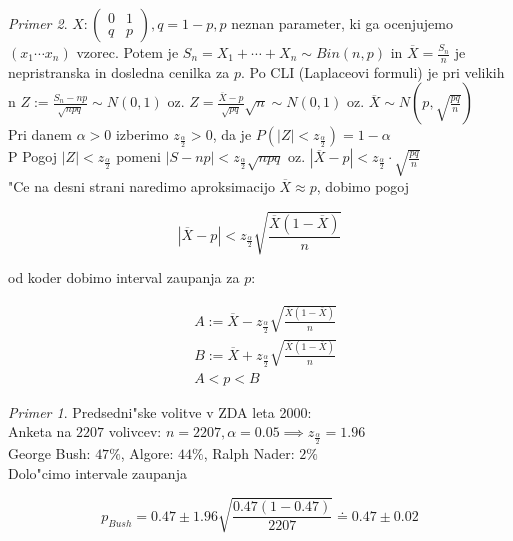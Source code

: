 \documentclass[a4paper,12pt]{article}
\theoremstyle{definition}
\theoremstyle{remark}
\newtheorem*{ex}{Primer}
\begin{document}
\begin{ex}
    $X: \begin{pmatrix}
        0 & 1 \\
        q & p
    \end{pmatrix}, q = 1-p, p$ neznan parameter, ki ga ocenjujemo \\
    $(x_1 \cdots x_n)$ vzorec. Potem je $S_n = X_1 + \cdots + X_n \sim Bin(n,p)$ in $\overline{X} = \frac{S_n}{n}$
    je nepristranska in dosledna cenilka za $p$. Po CLI (Laplaceovi formuli) je pri velikih n
    $Z := \frac{S_n - np}{\sqrt{npq}} \sim N(0,1)$ oz. $Z = \frac{\overline{X} - p}{\sqrt{pq}} \sqrt{n} \sim N(0,1)$
    oz. $\overline{X} \sim N(p, \sqrt{\frac{pq}{n}})$ \\
    Pri danem $\alpha > 0$ izberimo $z_{\frac{\alpha}{2}} > 0$, da je $P(|Z| < z_{\frac{\alpha}{2}}) = 1 - \alpha$ \\P
    Pogoj $|Z| < z_{\frac{\alpha}{2}}$ pomeni $|S - np| < z_{\frac{\alpha}{2}} \sqrt{npq}$ oz.
    $|\overline{X} - p| < z_{\frac{\alpha}{2}} \cdot \sqrt{\frac{pq}{n}}$ \\
    "Ce na desni strani naredimo aproksimacijo $\overline{X} \approx p$, dobimo pogoj

    \begin{equation*}
        |\overline{X} - p| < z_{\frac{\alpha}{2}} \sqrt{\frac{\overline{X} (1-\overline{X})}{n}}
    \end{equation*}

    od koder dobimo interval zaupanja za $p$:

    \begin{align*}
        &A := \overline{X} - z_{\frac{\alpha}{2}} \sqrt{\frac{\overline{X} (1-\overline{X})}{n}} \\
        &B := \overline{X} + z_{\frac{\alpha}{2}} \sqrt{\frac{\overline{X} (1-\overline{X})}{n}} \\
        &A < p < B
    \end{align*}

    \begin{ex}
        Predsedni"ske volitve v ZDA leta 2000: \\
        Anketa na $2207$ volivcev: $n=2207, \alpha = 0.05 \implies z_{\frac{\alpha}{2}} = 1.96$ \\
        George Bush: $47\%$, Algore: $44\%$, Ralph Nader: $2\%$ \\
        Dolo"cimo intervale zaupanja

        \begin{equation*}
            p_{Bush} = 0.47 \pm 1.96 \sqrt{\frac{0.47 (1-0.47)}{2207}} \doteq 0.47 \pm 0.02
        \end{equation*}


\end{ex}
\end{ex}
\end{document}

